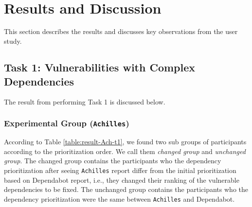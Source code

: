 \documentclass[conference]{IEEEtran}
\begin{document}
	
	
	\section{Results and Discussion}
	This section describes the results and discusses key observations from the user study.
	
	\subsection{Task 1: Vulnerabilities with Complex Dependencies}
	
	The result from performing Task 1 is discussed below.
	
	\subsubsection{Experimental Group (\texttt{Achilles})}
	According to Table \ref{table:result-Ach-t1}, we found two sub groups of participants according to the prioritization order. We call them \textit{changed group} and \textit{unchanged group}. The changed group contains the participants who the dependency prioritization after seeing \texttt{Achilles} report differ from the  initial prioritization based on Dependabot report, i.e., they changed their ranking of the vulnerable dependencies to be fixed. The unchanged group contains the participants who the dependency prioritization were the same between \texttt{Achilles} and Dependabot.
	
\end{document}
